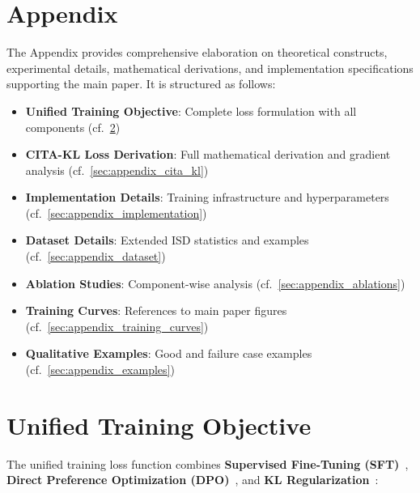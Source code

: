 
\newpage
\appendix
\section{Appendix}
\label{sec:appendix}

The Appendix provides comprehensive elaboration on theoretical constructs, experimental details, mathematical derivations, and implementation specifications supporting the main paper. It is structured as follows:

\begin{itemize}[leftmargin=*,itemsep=2pt]
    \item \textbf{Unified Training Objective}: Complete loss formulation with all components (cf.~\cref{sec:appendix_unified})
    \item \textbf{CITA-KL Loss Derivation}: Full mathematical derivation and gradient analysis (cf.~\cref{sec:appendix_cita_kl})
    \item \textbf{Implementation Details}: Training infrastructure and hyperparameters (cf.~\cref{sec:appendix_implementation})
    \item \textbf{Dataset Details}: Extended ISD statistics and examples (cf.~\cref{sec:appendix_dataset})
    \item \textbf{Ablation Studies}: Component-wise analysis (cf.~\cref{sec:appendix_ablations})
    \item \textbf{Training Curves}: References to main paper figures (cf.~\cref{sec:appendix_training_curves})
    \item \textbf{Qualitative Examples}: Good and failure case examples (cf.~\cref{sec:appendix_examples})
\end{itemize}

\section{Unified Training Objective}
\label{sec:appendix_unified}

The unified training loss function combines \textbf{Supervised Fine-Tuning (SFT)}~\cite{wei2022finetuned}, \textbf{Direct Preference Optimization (DPO)}~\cite{rafailov2023direct}, and \textbf{KL Regularization}~\cite{schulman2017proximal,korbak2022rl}:

